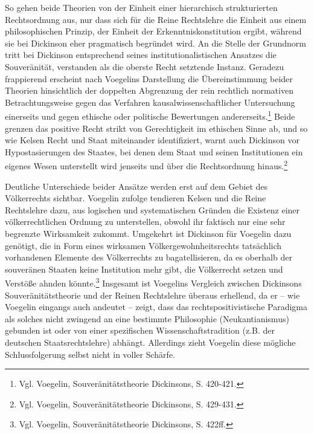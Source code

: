 \documentclass[12pt,a4paper,ngerman]{article}
\begin{document}
So gehen beide Theorien von der Einheit einer hierarchisch
strukturierten Rechtsordnung aus, nur dass sich für die Reine
Rechtslehre die Einheit aus einem philosophischen Prinzip, der Einheit
der Erkenntniskonstitution ergibt, während sie bei Dickinson eher
pragmatisch begründet wird. An die Stelle der Grundnorm tritt bei
Dickinson entsprechend seines institutionalistischen Ansatzes die
Souveränität, verstanden als die oberste Recht setztende Instanz.
Geradezu frappierend erscheint nach Voegelins Darstellung die
Übereinstimmung beider Theorien hinsichtlich der doppelten Abgrenzung
der rein rechtlich normativen Betrachtungsweise gegen das Verfahren
kausalwissenschaftlicher Untersuchung einerseits und gegen ethische
oder politische Bewertungen andererseits.\footnote{Vgl.  Voegelin,
  Souveränitätstheorie Dickinsons, S. 420-421.} Beide grenzen das
positive Recht strikt von Gerechtigkeit im ethischen Sinne ab, und so
wie Kelsen Recht und Staat miteinander identifiziert, warnt auch
Dickinson vor Hypostasierungen des Staates, bei denen dem Staat und
seinen Institutionen ein eigenes Wesen unterstellt wird jenseits und
über die Rechtsordnung hinaus.\footnote{Vgl.  Voegelin,
  Souveränitätstheorie Dickinsons, S. 429-431.}

Deutliche Unterschiede beider Ansätze werden erst auf dem Gebiet des
Völkerrechts sichtbar. Voegelin zufolge tendieren Kelsen und die Reine
Rechtslehre dazu, aus logischen und systematischen Gründen die Existenz einer
völkerrechtlichen Ordnung zu unterstellen, obwohl ihr faktisch nur eine sehr
begrenzte Wirksamkeit zukommt. Umgekehrt ist Dickinson für Voegelin dazu
genötigt, die in Form eines wirksamen Völkergewohnheitsrechts tatsächlich
vorhandenen Elemente des Völkerrechts zu bagatellisieren, da es oberhalb der
souveränen Staaten keine Institution mehr gibt, die Völkerrecht setzen und
Verstöße ahnden könnte.\footnote{Vgl. Voegelin, Souveränitätstheorie
  Dickinsons, S. 422ff.} Insgesamt ist Voegelins Vergleich zwischen Dickinsons
Souveränitätstheorie und der Reinen Rechtslehre überaus erhellend, da er --
wie Voegelin eingangs auch andeutet -- zeigt, dass das rechtspositivistische
Paradigma als solches nicht zwingend an eine bestimmte Philosophie
(Neukantianismus) gebunden ist oder von einer spezifischen
Wissenschaftstradition (z.B. der deutschen Staatsrechtslehre) abhängt.
Allerdings zieht Voegelin diese mögliche Schlussfolgerung selbst nicht in
voller Schärfe.
\end{document}
